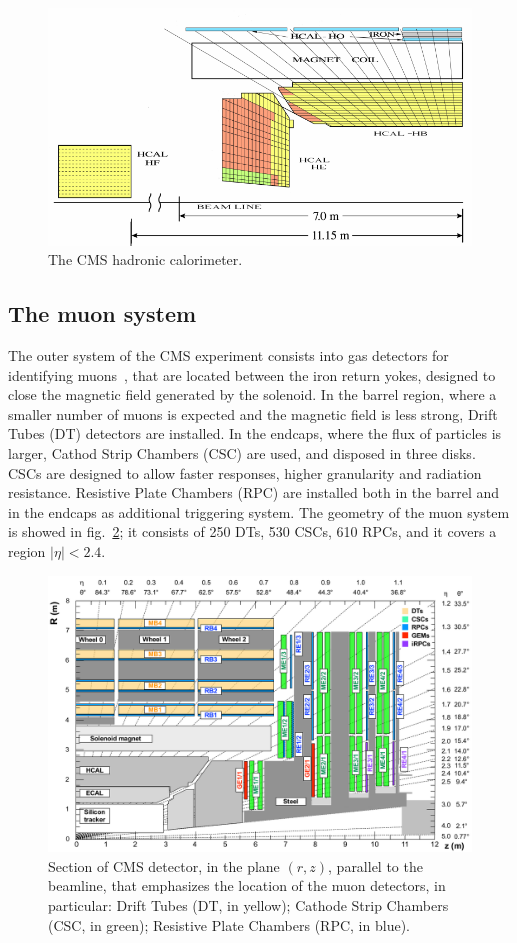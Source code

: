 \begin{figure}[!htb]
  \centering
    \includegraphics[width=.7\textwidth]{figures/cmshcal.png}
  \caption{The CMS hadronic calorimeter.}
  \label{fig:CMS_hcal}
\end{figure}


\subsection{The muon system}


The outer system of the CMS experiment consists into gas detectors for identifying muons~\cite{MUON-TDR}, that are located between the iron return yokes, designed to close the magnetic field generated by the solenoid. In the barrel region, where a smaller number of muons is expected and the magnetic field is less strong, Drift Tubes (DT) detectors are installed. In the endcaps, where the flux of particles is larger, Cathod Strip Chambers (CSC) are used, and disposed in three disks. CSCs are designed to allow faster responses, higher granularity and radiation resistance. Resistive Plate Chambers (RPC) are installed both in the barrel and in the endcaps as additional triggering system. The geometry of the muon system is showed in fig.~\ref{fig:CMS_muon}; it consists of 250 DTs, 530 CSCs, 610 RPCs, and it covers a region $|\eta|<2.4$.

\begin{figure}[!htb]
  \centering
    \includegraphics[width=.9\textwidth]{figures/cmsmuon.png}
  \caption{Section of CMS detector, in the plane $(r,z)$, parallel to the beamline, that emphasizes the location of the muon detectors, in particular: Drift Tubes (DT, in yellow); Cathode Strip Chambers (CSC, in green); Resistive Plate Chambers (RPC, in blue).}
  \label{fig:CMS_muon}
\end{figure}


